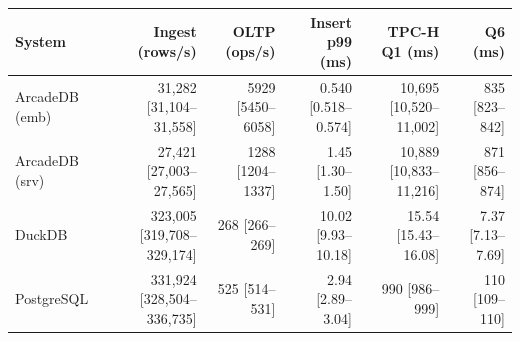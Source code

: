 \begin{tabular}{lrrrrr}
\toprule
System & Ingest (rows/s) & OLTP (ops/s) & Insert p99 (ms) & TPC-H Q1 (ms) & Q6 (ms) \\
\midrule
ArcadeDB (emb) & 31,282 [31,104--31,558] & 5929 [5450--6058] & 0.540 [0.518--0.574] & 10,695 [10,520--11,002] & 835 [823--842] \\
ArcadeDB (srv) & 27,421 [27,003--27,565] & 1288 [1204--1337] & 1.45 [1.30--1.50] & 10,889 [10,833--11,216] & 871 [856--874] \\
DuckDB & 323,005 [319,708--329,174] & 268 [266--269] & 10.02 [9.93--10.18] & 15.54 [15.43--16.08] & 7.37 [7.13--7.69] \\
PostgreSQL & 331,924 [328,504--336,735] & 525 [514--531] & 2.94 [2.89--3.04] & 990 [986--999] & 110 [109--110] \\
\bottomrule
\end{tabular}
